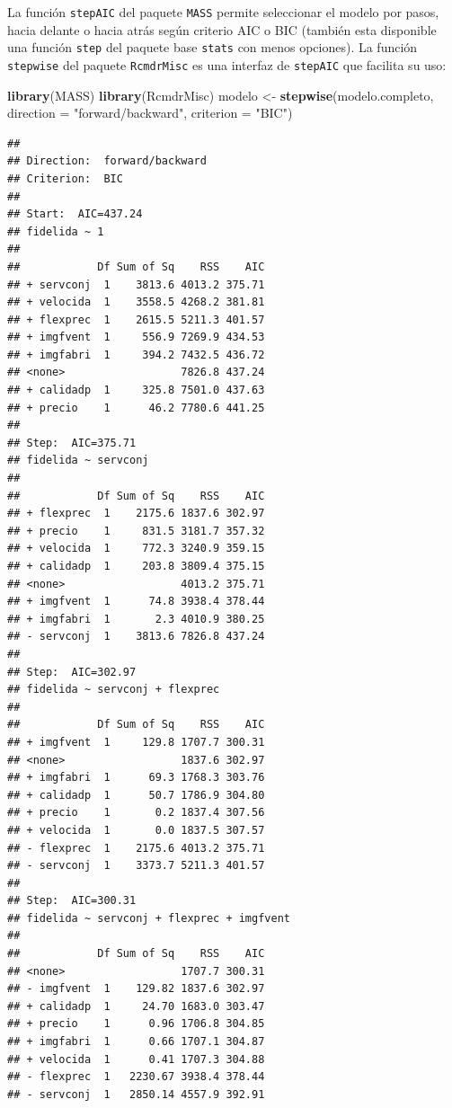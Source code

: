 \documentclass[]{book}
\newenvironment{Shaded}{\begin{snugshade}}{\end{snugshade}}
\newcommand{\KeywordTok}[1]{\textcolor[rgb]{0.13,0.29,0.53}{\textbf{#1}}}
\newcommand{\DataTypeTok}[1]{\textcolor[rgb]{0.13,0.29,0.53}{#1}}
\newcommand{\StringTok}[1]{\textcolor[rgb]{0.31,0.60,0.02}{#1}}
\newcommand{\NormalTok}[1]{#1}
\begin{document}
La función \texttt{stepAIC} del paquete \texttt{MASS} permite
seleccionar el modelo por pasos, hacia delante o hacia atrás según
criterio AIC o BIC (también esta disponible una función \texttt{step}
del paquete base \texttt{stats} con menos opciones). La función
\texttt{stepwise} del paquete \texttt{RcmdrMisc} es una interfaz de
\texttt{stepAIC} que facilita su uso:

\begin{Shaded}
\begin{Highlighting}[]
\KeywordTok{library}\NormalTok{(MASS)}
\KeywordTok{library}\NormalTok{(RcmdrMisc)}
\NormalTok{modelo <-}\StringTok{ }\KeywordTok{stepwise}\NormalTok{(modelo.completo, }\DataTypeTok{direction =} \StringTok{"forward/backward"}\NormalTok{, }\DataTypeTok{criterion =} \StringTok{"BIC"}\NormalTok{)}
\end{Highlighting}
\end{Shaded}

\begin{verbatim}
## 
## Direction:  forward/backward
## Criterion:  BIC 
## 
## Start:  AIC=437.24
## fidelida ~ 1
## 
##            Df Sum of Sq    RSS    AIC
## + servconj  1    3813.6 4013.2 375.71
## + velocida  1    3558.5 4268.2 381.81
## + flexprec  1    2615.5 5211.3 401.57
## + imgfvent  1     556.9 7269.9 434.53
## + imgfabri  1     394.2 7432.5 436.72
## <none>                  7826.8 437.24
## + calidadp  1     325.8 7501.0 437.63
## + precio    1      46.2 7780.6 441.25
## 
## Step:  AIC=375.71
## fidelida ~ servconj
## 
##            Df Sum of Sq    RSS    AIC
## + flexprec  1    2175.6 1837.6 302.97
## + precio    1     831.5 3181.7 357.32
## + velocida  1     772.3 3240.9 359.15
## + calidadp  1     203.8 3809.4 375.15
## <none>                  4013.2 375.71
## + imgfvent  1      74.8 3938.4 378.44
## + imgfabri  1       2.3 4010.9 380.25
## - servconj  1    3813.6 7826.8 437.24
## 
## Step:  AIC=302.97
## fidelida ~ servconj + flexprec
## 
##            Df Sum of Sq    RSS    AIC
## + imgfvent  1     129.8 1707.7 300.31
## <none>                  1837.6 302.97
## + imgfabri  1      69.3 1768.3 303.76
## + calidadp  1      50.7 1786.9 304.80
## + precio    1       0.2 1837.4 307.56
## + velocida  1       0.0 1837.5 307.57
## - flexprec  1    2175.6 4013.2 375.71
## - servconj  1    3373.7 5211.3 401.57
## 
## Step:  AIC=300.31
## fidelida ~ servconj + flexprec + imgfvent
## 
##            Df Sum of Sq    RSS    AIC
## <none>                  1707.7 300.31
## - imgfvent  1    129.82 1837.6 302.97
## + calidadp  1     24.70 1683.0 303.47
## + precio    1      0.96 1706.8 304.85
## + imgfabri  1      0.66 1707.1 304.87
## + velocida  1      0.41 1707.3 304.88
## - flexprec  1   2230.67 3938.4 378.44
## - servconj  1   2850.14 4557.9 392.91
\end{verbatim}
\end{document}
